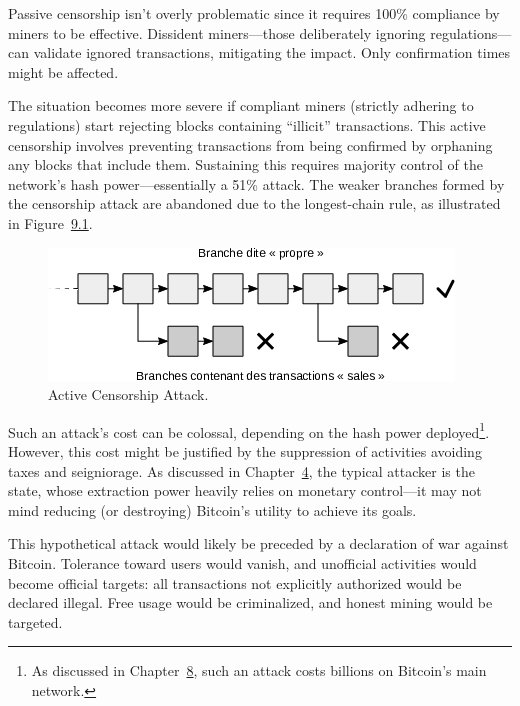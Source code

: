 \documentclass[
  a5paper,
  smalldemyvopaper,10pt,twoside,onecolumn,openright,extrafontsizes,hidelinks]{memoir}
\begin{document}
Passive censorship isn't overly problematic since it requires 100\%
compliance by miners to be effective. Dissident miners---those
deliberately ignoring regulations---can validate ignored transactions,
mitigating the impact. Only confirmation times might be affected.

The situation becomes more severe if compliant miners (strictly adhering
to regulations) start rejecting blocks containing ``illicit''
transactions. This active censorship involves preventing transactions
from being confirmed by orphaning any blocks that include them.
Sustaining this requires majority control of the network's hash
power---essentially a 51\% attack. The weaker branches formed by the
censorship attack are abandoned due to the longest-chain rule, as
illustrated in Figure~\hyperref[fig:censorship-attack]{9.1}.

\begin{figure}

{\centering \includegraphics{chapters/img/mining-attack-censorship.png}

}

\caption{Active Censorship Attack.}

\end{figure}%

Such an attack's cost can be colossal, depending on the hash power
deployed\footnote{As discussed in Chapter~\hyperref[ch:confirmation]{8},
  such an attack costs billions on Bitcoin's main network.}. However,
this cost might be justified by the suppression of activities avoiding
taxes and seigniorage. As discussed in
Chapter~\hyperref[ch:adversaire]{4}, the typical attacker is the state,
whose extraction power heavily relies on monetary control---it may not
mind reducing (or destroying) Bitcoin's utility to achieve its goals.

This hypothetical attack would likely be preceded by a declaration of
war against Bitcoin. Tolerance toward users would vanish, and unofficial
activities would become official targets: all transactions not
explicitly authorized would be declared illegal. Free usage would be
criminalized, and honest mining would be targeted.
\end{document}
